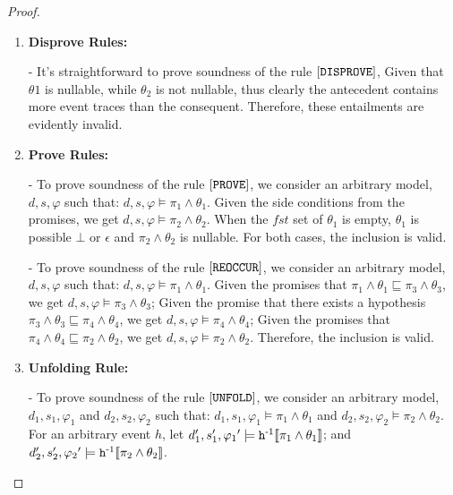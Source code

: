 \documentclass[acmsmall,10pt,review]{acmart}
\newcommand{\es}{\theta}
\newcommand{\code}[1]{{\tt{\ensuremath{\m{#1}}}}}
\newcommand{\codeme}[1]{{\tt{\ensuremath{#1}}}}
\newcommand{\CONTAIN}{\sqsubseteq}
\newcommand{\m}{\mathit}
\begin{document}
{{{\begin{proof}
\begin{enumerate}
  
  \item \textbf{Disprove Rules:} 
  
  - It's straightforward to prove soundness of the rule $\codeme{[DISPROVE]}$, Given that \codeme{\es1} is nullable, while \codeme{ \es_2} is not nullable, thus clearly the antecedent contains more event traces than the consequent.  Therefore, these entailments are evidently invalid.\\
  
  
  \item \textbf{Prove Rules:} 
  
  - To prove soundness of the rule $\codeme{[PROVE]}$, we consider an arbitrary model, \codeme{d, s, \varphi} such that:  
  \codeme{d,  s, \varphi \models  {\pi_1 \wedge \es_1}}. Given the side 
  conditions from the promises, we get \codeme{d,  s, \varphi \models 
  {\pi_2 \wedge \es_2}}. When the \code{\m{fst}} set of \code{\es_1} is 
  empty, \code{\es_1} is possible \code{\bot} or \code{\epsilon} and 
  \code{\pi_2 \wedge \es_2} is nullable. For both cases, the inclusion 
  is valid. 
  
  - To prove soundness of the rule $\codeme{[REOCCUR]}$, we consider 
  an arbitrary model, \codeme{d, s, \varphi} such that:  \codeme{d,  s, 
  \varphi \models  {\pi_1 \wedge \es_1}}. Given the promises that  
  \codeme{\pi_1 \wedge \es_1 \CONTAIN \pi_3 \wedge \es_3}, we get 
  \codeme{d,  s, \varphi \models {\pi_3 \wedge \es_3}}; Given the 
  promise that there exists a hypothesis \codeme{\pi_3 \wedge \es_3 
  \CONTAIN  \pi_4 \wedge \es_4}, we get \codeme{d, s, \varphi \models 
  {\pi_4 \wedge \es_4}}; Given the promises that  
  \codeme{\pi_4 \wedge \es_4 \CONTAIN \pi_2 \wedge \es_2}, we get 
  \codeme{d, s,  \varphi \models {\pi_2 \wedge \es_2}}. Therefore,  
  the inclusion is valid. 
  \\
  
  
  \item \textbf{Unfolding Rule:} 
  
  
  
  - To prove soundness of the rule $\codeme{[UNFOLD]}$, we consider an 
  arbitrary model, \codeme{d_1, s_1,  \varphi_1} and \codeme{d_2, s_2,
   \varphi_2}  such that:  \codeme{d_1, s_1,  \varphi_1 \models {\pi_1 \wedge
    \es_1}} and \codeme{d_2, s_2,  \varphi_2 \models  {\pi_2 \wedge \es_2}}. 
    For an arbitrary event \codeme{h}, let \codeme{d_1^\prime, s_1^\prime,
     {\varphi_1}^\prime \models \codeme{h}^{\text{-}1}\llbracket  \pi_1\wedge \es_1 \rrbracket}; 
     and 
  \codeme{d_2^\prime, s_2^\prime, {\varphi_2}^\prime \models 
  \codeme{h}^{\text{-}1}\llbracket \pi_2 \wedge \es_2 \rrbracket}. 
  

\end{enumerate}
\end{proof}}}}
\end{document}

